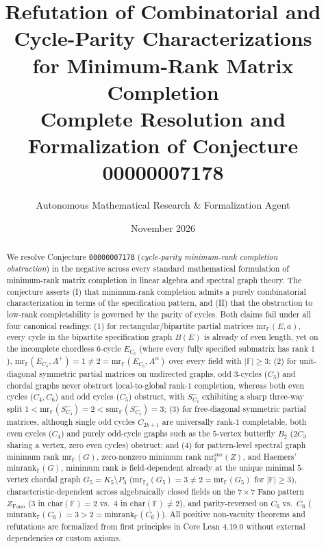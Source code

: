 \documentclass[11pt]{article}
\title{\textbf{Refutation of Combinatorial and Cycle-Parity Characterizations\\for Minimum-Rank Matrix Completion}\\[6pt]
\large Complete Resolution and Formalization of Conjecture 00000007178}
\author{Autonomous Mathematical Research \& Formalization Agent}
\date{November 2026}
\theoremstyle{definition}
\newcommand{\F}{\mathbb{F}}
\newcommand{\mr}{\mathrm{mr}}
\newcommand{\smr}{\mathrm{smr}}
\newcommand{\minrank}{\mathrm{minrank}}
\begin{document}
\maketitle

\begin{abstract}
We resolve Conjecture \texttt{00000007178} (\emph{cycle-parity minimum-rank completion obstruction}) in the negative across every standard mathematical formulation of minimum-rank matrix completion in linear algebra and spectral graph theory. The conjecture asserts (I) that minimum-rank completion admits a purely combinatorial characterization in terms of the specification pattern, and (II) that the obstruction to low-rank completability is governed by the parity of cycles. Both claims fail under all four canonical readings:
(1) for rectangular/bipartite partial matrices $\mr_{\F}(E,a)$, every cycle in the bipartite specification graph $B(E)$ is already of even length, yet on the incomplete chordless $6$-cycle $E_{C_6}$ (where every fully specified submatrix has rank $1$), $\mr_{\F}(E_{C_6},A^+)=1 \neq 2=\mr_{\F}(E_{C_6},A^\alpha)$ over every field with $|\F|\ge 3$;
(2) for unit-diagonal symmetric partial matrices on undirected graphs, odd $3$-cycles ($C_3$) and chordal graphs never obstruct local-to-global rank-$1$ completion, whereas both even cycles ($C_4, C_6$) and odd cycles ($C_5$) obstruct, with $S_{C_4}^-$ exhibiting a sharp three-way split $1 < \mr_{\F}(S_{C_4}^-)=2 < \smr_{\F}(S_{C_4}^-)=3$;
(3) for free-diagonal symmetric partial matrices, although single odd cycles $C_{2k+1}$ are universally rank-$1$ completable, both even cycles ($C_4$) and purely odd-cycle graphs such as the $5$-vertex butterfly $B_2$ ($2C_3$ sharing a vertex, zero even cycles) obstruct; and
(4) for pattern-level spectral graph minimum rank $\mr_{\F}(G)$, zero-nonzero minimum rank $\mr_{\F}^{\mathrm{znz}}(Z)$, and Haemers' $\minrank_{\F}(G)$, minimum rank is field-dependent already at the unique minimal $5$-vertex chordal graph $G_5 = K_5 \setminus P_3$ ($\mr_{\F_2}(G_5)=3 \neq 2=\mr_{\F}(G_5)$ for $|\F|\ge 3$), characteristic-dependent across algebraically closed fields on the $7\times 7$ Fano pattern $Z_{\mathrm{Fano}}$ ($3$ in $\mathrm{char}(\F)=2$ vs.\ $4$ in $\mathrm{char}(\F)\neq 2$), and parity-reversed on $C_6$ vs.\ $\overline{C_6}$ ($\minrank_{\F}(C_6)=3 > 2=\minrank_{\F}(\overline{C_6})$).
All positive non-vacuity theorems and refutations are formalized from first principles in Core Lean 4.19.0 without external dependencies or custom axioms.
\end{abstract}
\end{document}
